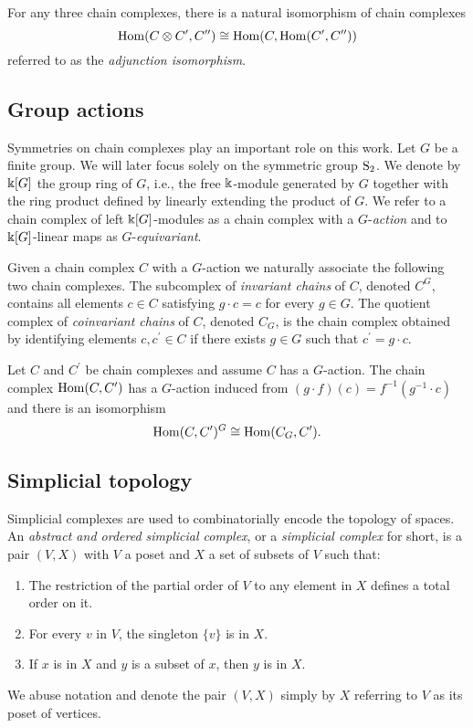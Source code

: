 For any three chain complexes, there is a natural isomorphism of chain complexes
\begin{equation} \label{e:adjunction isomorphism}
\Hom(C \otimes C^\prime, C^{\prime\prime}) \cong
\Hom(C, \Hom(C^\prime, C^{\prime\prime}))
\end{equation}
referred to as the \textit{adjunction isomorphism}.

\subsection{Group actions}

Symmetries on chain complexes play an important role on this work.
Let $G$ be a finite group.
We will later focus solely on the symmetric group $\S_2$.
We denote by $\k[G]$ the group ring of $G$, i.e., the free $\k$-module generated by $G$ together with the ring product defined by linearly extending the product of $G$.
We refer to a chain complex of left $\k[G]$-modules as a chain complex with a $G$-\textit{action} and to $\k[G]$-linear maps as $G$-\textit{equivariant}.

Given a chain complex $C$ with a $G$-action we naturally associate the following two chain complexes.
The subcomplex of \textit{invariant chains} of $C$, denoted $C^G$, contains all elements $c \in C$ satisfying $g \cdot c = c$ for every $g \in G$.
The quotient complex of \textit{coinvariant chains} of $C$, denoted $C_G$, is the chain complex obtained by identifying elements $c, c^\prime \in C$ if there exists $g \in G$ such that $c^\prime = g \cdot c$.

Let $C$ and $C^\prime$ be chain complexes and assume $C$ has a $G$-action.
The chain complex $\Hom(C, C^\prime)$ has a $G$-action induced from $(g \cdot f)(c) = f^{-1}(g^{-1} \cdot c)$ and there is an isomorphism
\begin{equation} \label{e:invariant hom iso hom coinvariants}
\Hom(C, C^\prime)^G \cong \Hom(C_G, C^\prime).
\end{equation}

\subsection{Simplicial topology}

Simplicial complexes are used to combinatorially encode the topology of spaces.
An \textit{abstract and ordered simplicial complex}, or a \textit{simplicial complex} for short, is a pair $(V, X)$ with $V$ a poset and $X$ a set of subsets of $V$ such that: 
\begin{enumerate}
	\item The restriction of the partial order of $V$ to any element in $X$ defines a total order on it.
	\item For every $v$ in $V$, the singleton $\{v\}$ is in $X$.
	\item If $x$ is in $X$ and $y$ is a subset of $x$, then $y$ is in $X$.
\end{enumerate}
We abuse notation and denote the pair $(V, X)$ simply by $X$ referring to $V$ as its poset of vertices.

